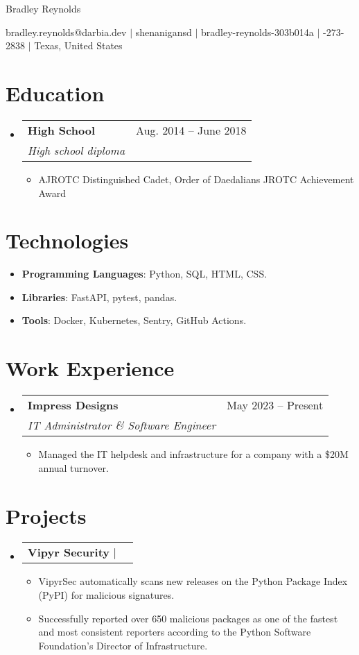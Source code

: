 \documentclass[letterpaper,11pt]{article}
\makeatletter
\let\emph\relax
\newcommand{\resumeItem}[1]{
  \item\small{
    {#1 \vspace{-2pt}}
  }
}
\newcommand{\resumeSubheading}[4]{
  \vspace{-2pt}\item
    \begin{tabular*}{0.97\textwidth}[t]{l@{\extracolsep{\fill}}r}
      \textbf{#1} & #2 \\
      \textit{\small#3} & \textit{\small #4} \\
    \end{tabular*}\vspace{-7pt}
}
\newcommand{\resumeProjectHeading}[2]{
    \item
    \begin{tabular*}{0.97\textwidth}{l@{\extracolsep{\fill}}r}
      \small#1 & #2 \\
    \end{tabular*}\vspace{-7pt}
}
\newcommand{\resumeSubItem}[1]{\resumeItem{#1}\vspace{-4pt}}
\newcommand{\resumeSubheadingListStart}{\begin{itemize}[leftmargin=0.15in, label={}]}
\newcommand{\resumeSubheadingListEnd}{\end{itemize}}
\newcommand{\resumeItemListStart}{\begin{itemize}}
\newcommand{\resumeItemListEnd}{\end{itemize}}
\newcommand{\myemail}{bradley.reynolds@darbia.dev}
\newcommand{\myname}{Bradley Reynolds}
\newcommand{\mygh}{shenanigansd}
\newcommand{\mylinkedin}{bradley-reynolds-303b014a}
\newcommand{\myphone}{940-273-2838}
\newcommand{\mylocation}{Texas, United States}
\newcommand{\myemail}{bradley.reynolds@darbia.dev}
\newcommand{\myname}{Bradley Reynolds}
\newcommand{\mygh}{shenanigansd}
\newcommand{\mylinkedin}{bradley-reynolds-303b014a}
\newcommand{\myphone}{940-273-2838}
\newcommand{\mylocation}{Texas, United States}
\makeatother
\begin{document}
{\Huge \myname}
\\
\vspace{2pt}

\small{
    \faEnvelope
    \thinspace \thinspace
    \myemail
    \thinspace \thinspace $|$
    \faGithub
    \thinspace \thinspace
    \mygh
    \thinspace \thinspace $|$
    \faLinkedin
    \thinspace \thinspace
    \mylinkedin
    \thinspace \thinspace $|$
    \faPhone
    \thinspace \thinspace
    \myphone
    \thinspace \thinspace $|$
    \thinspace \thinspace
    \mylocation
}

\vspace{-11pt}

\section{Education}
  \resumeSubheadingListStart
    \resumeSubheading{High School}{Aug. 2014 -- June 2018}{High school diploma}{}
    \resumeItemListStart
        \resumeItem{AJROTC Distinguished Cadet, Order of Daedalians JROTC Achievement Award}
    \resumeItemListEnd
  \resumeSubheadingListEnd

\section{Technologies}
\resumeSubheadingListStart
    \resumeSubItem{\textbf{Programming Languages}{:
        Python,
        SQL,
        HTML,
        CSS.
    }} \\
    \resumeSubItem{\textbf{Libraries}{:
        FastAPI,
        pytest,
        pandas.
    }} \\
    \resumeSubItem{\textbf{Tools}{:
        Docker,
        Kubernetes,
        Sentry,
        GitHub Actions.
    }}
\resumeSubheadingListEnd

\section{Work Experience}
    \resumeSubheadingListStart
        \resumeSubheading{Impress Designs}{May 2023 -- Present}{IT Administrator \& Software Engineer}{}
        \resumeItemListStart
            \resumeItem{Managed the IT helpdesk and infrastructure for a company with a \$20M annual turnover.}
        \resumeItemListEnd
    \resumeSubheadingListEnd


\section{Projects}
    \resumeSubheadingListStart
        \resumeProjectHeading{\textbf{Vipyr Security} $|$ \emph{Python, FastAPI, Sentry}}{}
        \resumeItemListStart
            \resumeItem{VipyrSec automatically scans new releases on the Python Package Index (PyPI) for malicious signatures.}
            \resumeItem{Successfully reported over 650 malicious packages as
            one of the fastest and most consistent reporters according to the
        Python Software Foundation's Director of Infrastructure.}
        \resumeItemListEnd
    \resumeSubheadingListEnd
\end{document}
